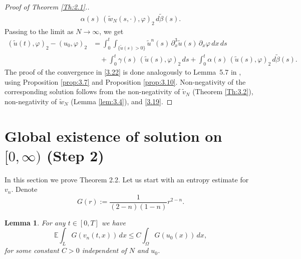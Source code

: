 \documentclass[a4paper,12pt]{article}
\newtheorem{lemma}[definition]{Lemma}
\numberwithin{equation}{section}
\begin{document}
\begin{proof}[Proof of Theorem \ref{Th:2.1}.]
\begin{align}
\alpha(s)\,(\tilde w_N(s, \cdot),\varphi)_2\, d\tilde\beta(s).
\label{3.22}
\end{align}
Passing to the limit as $N \to \infty$, we get
\begin{align*}
(\tilde u(t),\varphi)_2 - (u_0,\varphi)_2
&= \int_0^t \int_{\{\tilde u(s)>0\}}
\tilde u^n(s)\, \partial_x^3 \tilde u(s)\, \partial_x \varphi \, dx\, ds
\nonumber\\
&\quad + \int_0^t \gamma(s)\,(\tilde u(s),\varphi)_2\, ds
+ \int_0^t \alpha(s)\,(\tilde u(s),\varphi)_2\, d\tilde\beta(s).
\end{align*}
The proof of the convergence in \eqref{3.22} is done analogously to
Lemma~5.7 in \cite{Gess1}, using Proposition \ref{prop:3.7} and Proposition \ref{prop:3.10}. Non-negativity of the corresponding solution follows from the non-negativity of $\tilde{v}_N$ (Theorem \ref{Th:3.2}), non-negativity of $\tilde{w}_N$ (Lemma \ref{lem:3.4}), and \eqref{3.19}.
\end{proof}



\section{Global existence of solution on $[0,\infty)$ (Step 2)}\label{Sec 4}
In this section we prove Theorem 2.2. Let us start with an entropy estimate for $v_n$. Denote
\[
G(r) := \frac{1}{(2-n)(1-n)} r^{2-n}.
\]
\begin{lemma}\label{lem:4.1}
For any $t \in [0,T]$ we have
\begin{equation}
\mathbb{E} \int_L G(v_n(t,x))\, dx 
\le C \int_\Omega G(u_0(x))\, dx,
\label{4.1}
\end{equation}
for some constant $C>0$ independent of $N$ and $u_0$.
\end{lemma}
\end{document}

